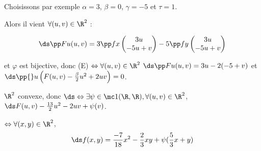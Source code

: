 \begin{exemple}
    \svspace Choisissons par exemple $\alpha = 3$, $\beta = 0$, $\gamma = -5$ et $\tau = 1$.

    \avspace Alors il vient $\forall (u, v) \in \R^2$ :

    $$\ds \pp F u (u, v) = 3 \pp f x \begin{pmatrix}
        3 u \\
        -5 u + v
    \end{pmatrix} - 5 \pp f y \begin{pmatrix}
        3 u \\
        -5 u + v
    \end{pmatrix}$$

    et $\varphi$ est bijective, donc (E) $\Leftrightarrow \forall (u, v) \in \R^2$
    $\ds \pp F u (u, v) = 3 u - 2 (-5 + v)$ et $\ds \pp{} u \left( F(u, v) - \frac \beta 2 u^2 + 2 uv \right) = 0$.

    $\R^2$ convexe, donc $\ds \Leftrightarrow \exists \psi \in \mc 1 (\R, \R), \forall (u, v) \in \R^2$,
    $\ds F(u, v) - \frac {13} 2 u^2 - 2uv + \psi(v)$. 

    $\Leftrightarrow \forall (x, y) \in \R^2$,
    $$\ds f(x, y) = \frac{-7}{18} x^2 - \frac 2 3 x y + \psi(\frac 5 3 x + y)$$
\end{exemple}




